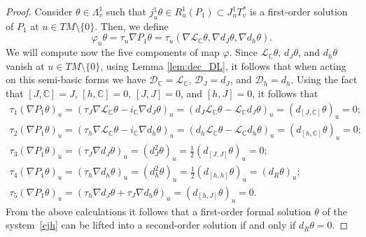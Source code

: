 \documentclass[11pt]{article}
\numberwithin{equation}{section}
\begin{document}
\begin{proof}
Consider $\theta\in \Lambda^1_v$ such that $j^1_u\theta\in
R^1_u(P_1)\subset J_u^1T^*_v$ is a f\/irst-order solution of $P_1$
at $u\in TM\setminus\{0\}$. Then, we def\/ine
\[
 \varphi_u\theta=\tau_u\nabla P_1\theta=\tau_u(\nabla \mathcal{L}_{\mathbb{C}}\theta,
\nabla d_J\theta, \nabla d_h\theta).
\] We will compute now the
f\/ive components of map $\varphi$. Since
$\mathcal{L}_{\mathbb{C}}\theta$, $d_J\theta$, and $d_h\theta$
vanish at $u\in TM\setminus\{0\}$, using Lemma \ref{lem:dec_DL},
it follows that when acting on this semi-basic forms we have
$\mathcal{D}_{\mathbb{C}}=\mathcal{L}_{\mathbb{C}}$,
$\mathcal{D}_{J}=d_J$, and $\mathcal{D}_{h}=d_h$. Using the fact that
$[J, \mathbb{C}]=J$, $[h, \mathbb{C}]=0$,  $[J, J]=0$, and $[h,J]=0$,
it follows that
\begin{gather*}
\tau_{1}\left(\nabla P_1\theta\right)_u  =  \left(\tau_J\nabla
\mathcal{L}_{\mathbb{C}} \theta - i_{\mathbb{C}}\nabla
d_J\theta\right)_u= \left(d_J\mathcal{L}_{\mathbb{C}} \theta -
\mathcal{L}_{\mathbb{C}} d_J\theta\right)_u =
(d_{[J,\mathbb{C}]}\theta)_u=0; \\
\tau_{2}\left(\nabla P_1\theta\right)_u  =  \left(\tau_h\nabla
\mathcal{L}_{\mathbb{C}} \theta - i_{\mathbb{C}}\nabla
d_h\theta\right)_u= \left(d_h\mathcal{L}_{\mathbb{C}} \theta -
\mathcal{L}_{\mathbb{C}} d_h\theta\right)_u =
(d_{[h,\mathbb{C}]}\theta)_u=0; \\
\tau_{3}\left(\nabla P_1\theta\right)_u  =  \left(\tau_J\nabla
d_J\theta\right)_u= \left(d^2_J\theta\right)_u
=\frac{1}{2}(d_{[J,J]}\theta)_u=0; \\
\tau_{4}\left(\nabla P_1\theta\right)_u  =  \left(\tau_h\nabla
d_h\theta\right)_u= \left(d^2_h\theta\right)_u
=\frac{1}{2}(d_{[h,h]}\theta)_u=(d_{R}\theta)_u; \\
\tau_{5}\left(\nabla P_1\theta\right)_u  =  \left(\tau_h\nabla
d_J\theta + \tau_J\nabla d_h\theta\right)_u=
(d_{[h,J]}\theta)_u=0.
\end{gather*}
From the above calculations it follows that a f\/irst-order formal
solution $\theta$ of the system~\eqref{cjh} can be lifted into a
second-order solution if and only if $d_R\theta=0$.
\end{proof}
\end{document}
